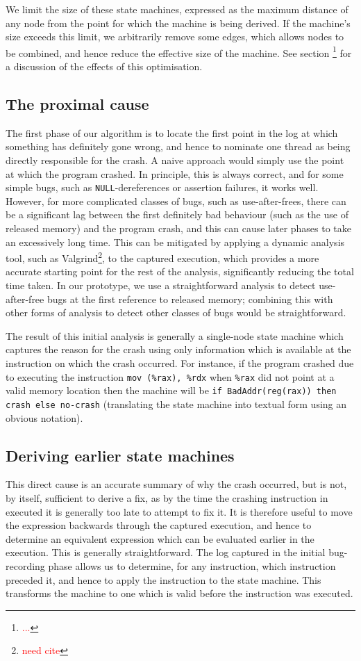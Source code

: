 \documentclass[10pt,twocolumn,preprint,natbib,authoryear]{sigplanconf}
\newcommand{\editorial}[1]{\textcolor{red}{\footnote{\textcolor{red}{#1}}}}
\newcommand{\needCite}{\editorial{need cite}}
\begin{document}
We limit the size of these state machines, expressed as the maximum
distance of any node from the point for which the machine is being
derived.  If the machine's size exceeds this limit, we arbitrarily
remove some edges, which allows nodes to be combined, and hence reduce
the effective size of the machine.  See section \editorial{...} for a
discussion of the effects of this optimisation.

\subsection{The proximal cause}
The first phase of our algorithm is to locate the first point in the
log at which something has definitely gone wrong, and hence to
nominate one thread as being directly responsible for the crash.  A
naive approach would simply use the point at which the program
crashed.  In principle, this is always correct, and for some simple
bugs, such as \verb|NULL|-dereferences or assertion failures, it works
well.  However, for more complicated classes of bugs, such as
use-after-frees, there can be a significant lag between the first
definitely bad behaviour (such as the use of released memory) and the
program crash, and this can cause later phases to take an excessively
long time.  This can be mitigated by applying a dynamic analysis tool,
such as Valgrind\needCite{}, to the captured execution, which provides
a more accurate starting point for the rest of the analysis,
significantly reducing the total time taken.  In our prototype, we use
a straightforward analysis to detect use-after-free bugs at the first
reference to released memory; combining this with other forms of
analysis to detect other classes of bugs would be straightforward.

The result of this initial analysis is generally a single-node state
machine which captures the reason for the crash using only information
which is available at the instruction on which the crash occurred.
For instance, if the program crashed due to executing the instruction
\verb|mov (%rax), %rdx| when \verb|%rax| did not point at a valid
memory location then the machine will be
\verb|if BadAddr(reg(rax)) then crash else no-crash| (translating the
state machine into textual form using an obvious notation).

\subsection{Deriving earlier state machines}
This direct cause is an accurate summary of why the crash occurred,
but is not, by itself, sufficient to derive a fix, as by the time the
crashing instruction in executed it is generally too late to attempt
to fix it.  It is therefore useful to move the expression backwards
through the captured execution, and hence to determine an equivalent
expression which can be evaluated earlier in the execution.  This is
generally straightforward.  The log captured in the initial
bug-recording phase allows us to determine, for any instruction, which
instruction preceded it, and hence to apply the instruction to the
state machine.  This transforms the machine to one which is valid
before the instruction was executed.
\end{document}
